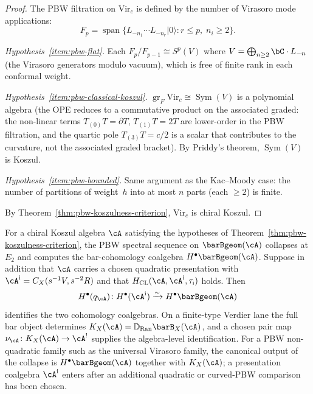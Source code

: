 \begin{proof}
The PBW filtration on $\mathrm{Vir}_c$ is defined by the
number of Virasoro mode applications:
\[
F_p = \operatorname{span}\{L_{-n_1} \cdots L_{-n_r}
|0\rangle : r \leq p,\; n_i \geq 2\}.
\]

\emph{Hypothesis~\ref{item:pbw-flat}.}
Each $F_p/F_{p-1} \cong S^p(V)$ where
$V = \bigoplus_{n \geq 2} \bC \cdot L_{-n}$
(the Virasoro generators modulo vacuum), which is
free of finite rank in each conformal weight.

\emph{Hypothesis~\ref{item:pbw-classical-koszul}.}
$\operatorname{gr}_F \mathrm{Vir}_c
\cong \operatorname{Sym}(V)$
is a polynomial algebra (the OPE reduces to a commutative
product on the associated graded: the non-linear terms
$T_{(0)}T = \partial T$, $T_{(1)}T = 2T$ are lower-order in the
PBW filtration, and the quartic pole $T_{(3)}T = c/2$ is a
scalar that contributes to the curvature, not the
associated graded bracket).
By Priddy's theorem, $\operatorname{Sym}(V)$ is Koszul.

\emph{Hypothesis~\ref{item:pbw-bounded}.}
Same argument as the Kac--Moody case: the number of
partitions of weight~$h$ into at most $n$ parts (each $\geq 2$)
is finite.

By Theorem~\ref{thm:pbw-koszulness-criterion},
$\mathrm{Vir}_c$ is chiral Koszul.
\end{proof}

\begin{corollary}
\label{cor:bar-cohomology-koszul-dual}
For a chiral Koszul algebra $\cA$ satisfying the hypotheses of
Theorem~\textup{\ref{thm:pbw-koszulness-criterion}},
the PBW spectral sequence on $\barBgeom(\cA)$ collapses
at $E_2$ and computes the bar-cohomology coalgebra
$H^\bullet\barBgeom(\cA)$.  Suppose in addition that $\cA$ carries a
chosen quadratic presentation with
$\cA^{\mathrm i}=C_X(s^{-1}V,s^{-2}R)$ and that
$H_{\mathrm{CL}}(\cA,\cA^{\mathrm i},\tau_{\mathrm i})$ holds.  Then
\[
 H^\bullet(q_\cA)\colon
 H^\bullet(\cA^{\mathrm i})
 \xrightarrow{\sim}H^\bullet\barBgeom(\cA)
\]
identifies the two cohomology coalgebras.  On a finite-type Verdier
lane the full bar object determines
$K_X(\cA)=\mathbb D_{\operatorname{Ran}}\barB_X(\cA)$, and a chosen
pair map $\nu_\cA\colon K_X(\cA)\to\cA^!$ supplies the algebra-level
identification.  For a PBW non-quadratic family such as the universal
Virasoro family, the canonical output of the collapse is
$H^\bullet\barBgeom(\cA)$ together with $K_X(\cA)$; a presentation
coalgebra $\cA^{\mathrm i}$ enters after an additional quadratic or
curved-PBW comparison has been chosen.
\end{corollary}

